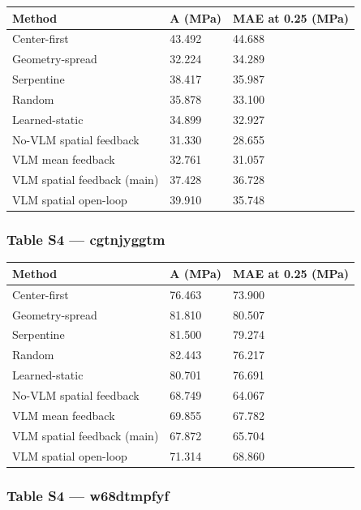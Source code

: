 \documentclass[11pt,a4paper]{article}
\begin{document}
{ %
\begin{longtable}[]{@{}lll@{}}
\toprule\noalign{}
Method & A (MPa) & MAE at 0.25 (MPa) \\
\midrule\noalign{}
\endhead
\bottomrule\noalign{}
\endlastfoot
Center-first & 43.492 & 44.688 \\
Geometry-spread & 32.224 & 34.289 \\
Serpentine & 38.417 & 35.987 \\
Random & 35.878 & 33.100 \\
Learned-static & 34.899 & 32.927 \\
No-VLM spatial feedback & 31.330 & 28.655 \\
VLM mean feedback & 32.761 & 31.057 \\
VLM spatial feedback (main) & 37.428 & 36.728 \\
VLM spatial open-loop & 39.910 & 35.748 \\
\end{longtable}
}

\subsubsection{Table S4 --- cgtnjyggtm}\label{table-s4-cgtnjyggtm}

{ %
\begin{longtable}[]{@{}lll@{}}
\toprule\noalign{}
Method & A (MPa) & MAE at 0.25 (MPa) \\
\midrule\noalign{}
\endhead
\bottomrule\noalign{}
\endlastfoot
Center-first & 76.463 & 73.900 \\
Geometry-spread & 81.810 & 80.507 \\
Serpentine & 81.500 & 79.274 \\
Random & 82.443 & 76.217 \\
Learned-static & 80.701 & 76.691 \\
No-VLM spatial feedback & 68.749 & 64.067 \\
VLM mean feedback & 69.855 & 67.782 \\
VLM spatial feedback (main) & 67.872 & 65.704 \\
VLM spatial open-loop & 71.314 & 68.860 \\
\end{longtable}
}

\subsubsection{Table S4 --- w68dtmpfyf}\label{table-s4-w68dtmpfyf}
\end{document}
